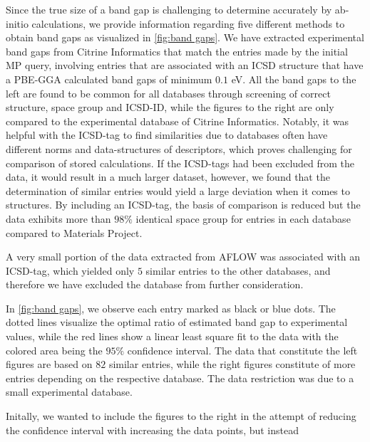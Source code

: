 Since the true size of a band gap is challenging to determine accurately by ab-initio calculations, we provide information regarding five different methods to obtain band gaps as visualized in \autoref{fig:band gaps}. We have extracted experimental band gaps from Citrine Informatics that match the entries made by the initial MP query, involving entries that are associated with an ICSD structure that have a PBE-GGA calculated band gaps of minimum $0.1$ eV.
All the band gaps to the left are found to be common for all databases through screening of correct structure, space group and ICSD-ID, while the figures to the right are only compared to the experimental database of Citrine Informatics.
Notably, it was helpful with the ICSD-tag to find similarities due to databases often have different norms and data-structures of descriptors, which proves challenging for comparison of stored calculations.
If the ICSD-tags had been excluded from the data, it would result in a much larger dataset, however, we found that the determination of similar entries would yield a large deviation when it comes to structures. By including an ICSD-tag, the basis of comparison is reduced but the data exhibits more than $98\%$ identical space group for entries in each database compared to Materials Project.

A very small portion of the data extracted from AFLOW was associated with an ICSD-tag, which yielded only $5$ similar entries to the other databases, and therefore we have excluded the database from further consideration.

In \autoref{fig:band gaps}, we observe each entry marked as black or blue dots. The dotted lines visualize the optimal ratio of estimated band gap to experimental values, while the red lines show a linear least square fit to the data with the colored area being the $95\%$ confidence interval. The data that constitute the left figures are based on $82$ similar entries, while the right figures constitute of more entries depending on the respective database. The data restriction was due to a small experimental database.

Initally, we wanted to include the figures to the right in the attempt of reducing the confidence interval with increasing the data points, but instead


